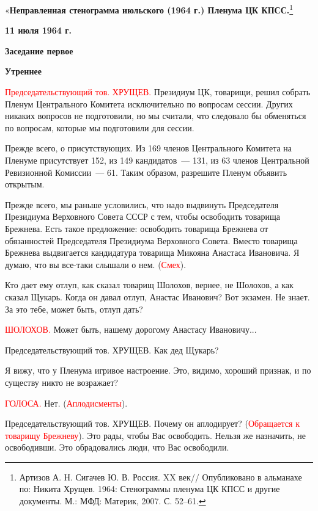 \documentclass{kursa4}
\begin{document}
{      «\textbf{{Неправленная стенограмма июльского (1964 г.) Пленума ЦК КПСС.}}\footnote{ Артизов А. Н. Сигачев Ю. В. Россия. XX век// Опубликовано в альманахе по: Никита Хрущев. 1964: Стенограммы пленума ЦК КПСС и другие документы. М.: МФД: Материк, 2007. С. 52–61.}

      \textbf{{11 июля 1964 г.}}

      \textbf{{Заседание первое}}

      \textbf{{Утреннее}}

      \textcolor{red}{Председательствующий тов. ХРУЩЕВ.}{ Президиум ЦК, товарищи, решил собрать Пленум Центрального Комитета исключительно по вопросам сессии. Других никаких вопросов не }{подготовили, но мы считали, что следовало бы обменяться по вопросам, которые мы подготовили для сессии.}

      {Прежде всего, о присутствующих. Из 169 членов Центрального Комитета на Пленуме присутствует 152, из 149 кандидатов~--- 131, из 63 членов Центральной Ревизионной Комиссии~--- 61. Таким образом, разрешите Пленум объявить открытым.}

      {Прежде всего, мы раньше условились, что надо выдвинуть Председателя Президиума Верховного Совета СССР с тем, чтобы освободить товарища Брежнева. Есть такое предложение: освободить товарища Брежнева от обязанностей Председателя Президиума Верховного Совета. Вместо товарища Брежнева выдвигается кандидатура товарища Микояна Анастаса Ивановича. Я думаю, что вы все-таки слышали о нем. (}\textcolor{red}{Смех}{).}

      {Кто дает ему отлуп, как сказал товарищ Шолохов, вернее, не Шолохов, а как сказал Щукарь. Когда он давал отлуп, Анастас Иванович? Вот экзамен. Не знает. За это тебе, может быть, отлуп дать?}

      \textcolor{red}{ШОЛОХОВ.}{
      Может быть, нашему дорогому Анастасу Ивановичу...}

      {Председательствующий тов. ХРУЩЕВ. Как дед Щукарь?}

      {Я вижу, что у Пленума игривое настроение. Это, видимо, хороший признак, и по существу никто не возражает?}

      \textcolor{red}{ГОЛОСА.}{
      Нет. (}\textcolor{red}{Аплодисменты}{).}

      {Председательствующий тов. ХРУЩЕВ. Почему он аплодирует? (}\textcolor{red}{Обращается к товарищу Брежневу}{). Это рады, чтобы Вас освободить. Нельзя же назначить, не освободивши. Это обрадовались люди, что Вас освободили.}

}
\end{document}
